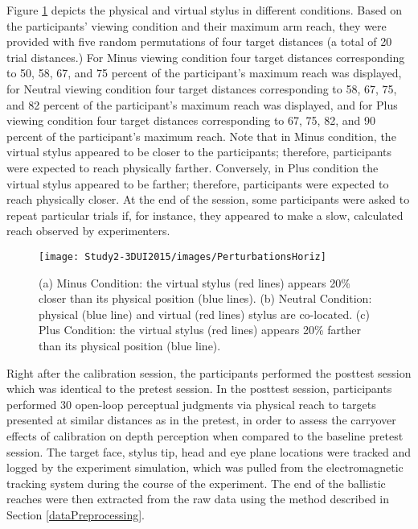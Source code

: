 Figure \ref{fig:Conditions} depicts the physical and virtual stylus in different conditions. Based on the participants' viewing condition and their maximum arm reach, they were provided with five random permutations of four target distances (a total of 20 trial distances.) For Minus viewing condition four target distances corresponding to 50, 58, 67, and 75 percent of the participant's maximum reach was displayed, for Neutral viewing condition four target distances corresponding to 58, 67, 75, and 82 percent of the participant's maximum reach was displayed, and for Plus viewing condition four target distances corresponding to 67, 75, 82, and 90 percent of the participant's maximum reach. Note that in Minus condition, the virtual stylus appeared to be closer to the participants; therefore, participants were expected to reach physically farther. Conversely, in Plus condition the virtual stylus appeared to be farther; therefore, participants were expected to reach physically closer. At the end of the session, some participants were asked to repeat particular trials if, for instance, they appeared to make a slow, calculated reach observed by experimenters. 

\begin{figure}[ht]
	\centering
	\texttt{[image: Study2-3DUI2015/images/PerturbationsHoriz]}
	\vspace{-1em}
	\caption{(a) Minus Condition: the virtual stylus (red lines) appears 20\% closer than its physical position (blue lines). (b) Neutral Condition: physical (blue line) and virtual (red lines) stylus are co-located. (c) Plus Condition: the virtual stylus (red lines) appears 20\% farther than its physical position (blue line).}
	\label{fig:Conditions}
	
\end{figure}

Right after the calibration session, the participants performed the posttest session which was identical to the pretest session. In the posttest session, participants performed 30 open-loop perceptual judgments via physical reach to targets presented at similar distances as in the pretest, in order to assess the carryover effects of calibration on depth perception when compared to the baseline pretest session. The target face, stylus tip, head and eye plane locations were tracked and logged by the experiment simulation, which was pulled from the electromagnetic tracking system during the course of the experiment. The end of the ballistic reaches were then extracted from the raw data using the method described in Section \ref{dataPreprocessing}.


